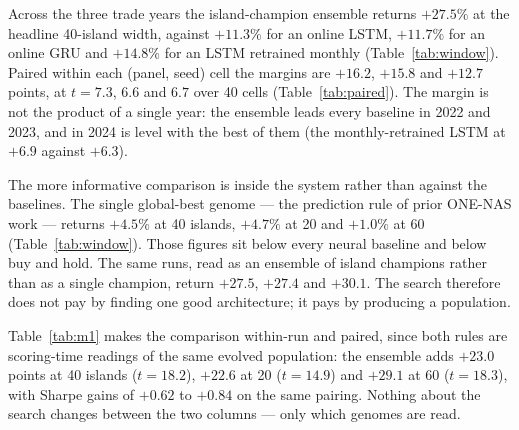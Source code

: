 %
%


Across the three trade years the island-champion ensemble returns
$+27.5\%$ at the headline 40-island width, against $+11.3\%$ for an
online LSTM, $+11.7\%$ for an online GRU and $+14.8\%$ for an LSTM
retrained monthly (Table~\ref{tab:window}). Paired within each (panel,
seed) cell the margins are $+16.2$, $+15.8$ and $+12.7$ points, at
$t=7.3$, $6.6$ and $6.7$ over 40 cells (Table~\ref{tab:paired}). The
margin is not the product of a single year: the ensemble leads every
baseline in 2022 and 2023, and in 2024 is level with the best of them
(the monthly-retrained LSTM at $+6.9$ against $+6.3$).


The more informative comparison is inside the system rather than against
the baselines. The single global-best genome --- the prediction rule of
prior ONE-NAS work --- returns $+4.5\%$ at 40 islands, $+4.7\%$ at 20 and
$+1.0\%$ at 60 (Table~\ref{tab:window}). Those figures sit below every
neural baseline and below buy and hold. The same runs, read as an
ensemble of island champions rather than as a single champion, return
$+27.5$, $+27.4$ and $+30.1$. The search therefore does not pay by
finding one good architecture; it pays by producing a population.

Table~\ref{tab:m1} makes the comparison within-run and paired, since both
rules are scoring-time readings of the same evolved population: the
ensemble adds $+23.0$ points at 40 islands ($t=18.2$), $+22.6$ at 20
($t=14.9$) and $+29.1$ at 60 ($t=18.3$), with Sharpe gains of $+0.62$ to
$+0.84$ on the same pairing. Nothing about the search changes between the
two columns --- only which genomes are read.

